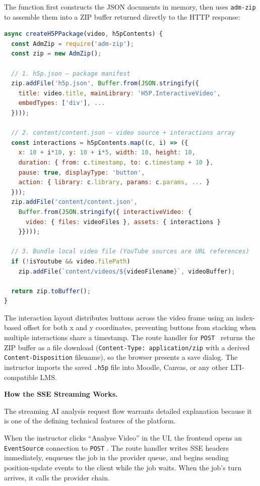 The function first constructs the JSON documents in memory, then uses \texttt{adm-zip} to assemble them into a ZIP buffer returned directly to the HTTP response:
\clearpage
\begin{lstlisting}[language=JavaScript,caption={createH5PPackage() — key structure of ZIP assembly}]
async createH5PPackage(video, h5pContents) {
  const AdmZip = require('adm-zip');
  const zip = new AdmZip();

  // 1. h5p.json — package manifest
  zip.addFile('h5p.json', Buffer.from(JSON.stringify({
    title: video.title, mainLibrary: 'H5P.InteractiveVideo',
    embedTypes: ['div'], ...
  })));

  // 2. content/content.json — video source + interactions array
  const interactions = h5pContents.map((c, i) => ({
    x: 10 + i*10, y: 10 + i*5, width: 10, height: 10,
    duration: { from: c.timestamp, to: c.timestamp + 10 },
    pause: true, displayType: 'button',
    action: { library: c.library, params: c.params, ... }
  }));
  zip.addFile('content/content.json',
    Buffer.from(JSON.stringify({ interactiveVideo: {
      video: { files: videoFiles }, assets: { interactions }
    }})));

  // 3. Bundle local video file (YouTube sources are URL references)
  if (!isYoutube && video.filePath)
    zip.addFile(`content/videos/${videoFilename}`, videoBuffer);

  return zip.toBuffer();
}
\end{lstlisting}

The interaction layout distributes buttons across the video frame using an index-based offset for both x and y coordinates, preventing buttons from stacking when multiple interactions share a timestamp. The route handler for \texttt{POST}~ returns the ZIP buffer as a file download (\texttt{Content-Type: application/zip} with a derived \texttt{Content-Disposition} filename), so the browser presents a save dialog. The instructor imports the saved \texttt{.h5p} file into Moodle, Canvas, or any other LTI-compatible LMS.

\textbf{How the SSE Streaming Works.}

The streaming AI analysis request flow warrants detailed explanation because it is one of the defining technical features of the platform.

When the instructor clicks ``Analyse Video'' in the UI, the frontend opens an \texttt{EventSource} connection to \texttt{POST} . The route handler writes SSE headers immediately, enqueues the job in the provider queue, and begins sending position-update events to the client while the job waits. When the job's turn arrives, it calls the provider chain.

